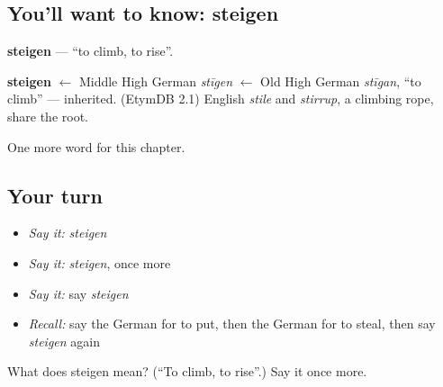 \subsection*{You'll want to know: steigen}
\textbf{steigen} — \textquotedblleft{}to climb, to rise\textquotedblright{}.

\begin{cousinweb}
\textbf{steigen} $\leftarrow$ Middle High German \emph{stīgen} $\leftarrow$ Old High German \emph{stīgan}, \textquotedblleft{}to climb\textquotedblright{} — inherited. (EtymDB 2.1) English \emph{stile} and \emph{stirrup}, a climbing rope, share the root.
\end{cousinweb}

\begin{grammarlens}[title={What you've built}]
One more word for this chapter.
\end{grammarlens}

\subsection*{Your turn}
\begin{itemize}
\raggedright
  \item \emph{Say it:} \emph{steigen}
  \item \emph{Say it:} \emph{steigen}, once more
  \item \emph{Say it:} say \emph{steigen}
  \item \emph{Recall:} say the German for to put, then the German for to steal, then say \emph{steigen} again
\end{itemize}

\begin{tcolorbox}[breakable,colback=teal!4,colframe=teal!35!black,title={Before you move on}]
What does steigen mean? (\textquotedblleft{}To climb, to rise\textquotedblright{}.) Say it once more.
\end{tcolorbox}
